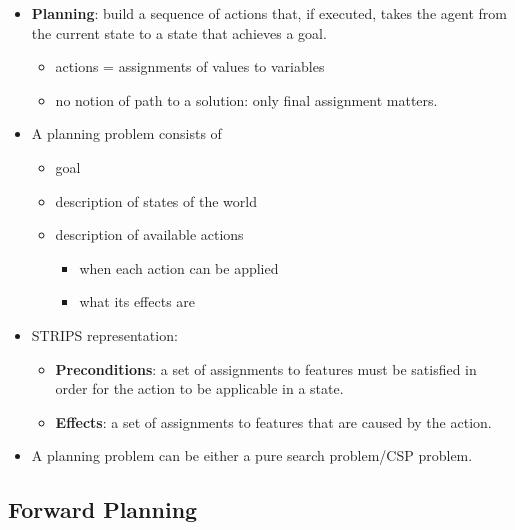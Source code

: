\documentclass{article}
\begin{document}
\begin{itemize}
    \item \textbf{Planning}: build a sequence of actions that, if executed, takes the agent from the current state to a state that achieves a goal.
        \begin{itemize}
            \item actions = assignments of values to variables
            \item no notion of path to a solution: only final assignment matters.
        \end{itemize}
    \item A planning problem consists of
        \begin{itemize}
            \item goal
            \item description of states of the world
            \item description of available actions
                \begin{itemize}
                    \item when each action can be applied
                    \item what its effects are
                \end{itemize}
        \end{itemize}
    \item STRIPS representation:
        \begin{itemize}
            \item \textbf{Preconditions}: a set of assignments to features must be satisfied in order for the action to be applicable in a state.
            \item \textbf{Effects}: a set of assignments to features that are caused by the action.
        \end{itemize}
    \item A planning problem can be either a pure search problem/CSP problem.
\end{itemize}

\subsection{Forward Planning}
\end{document}
